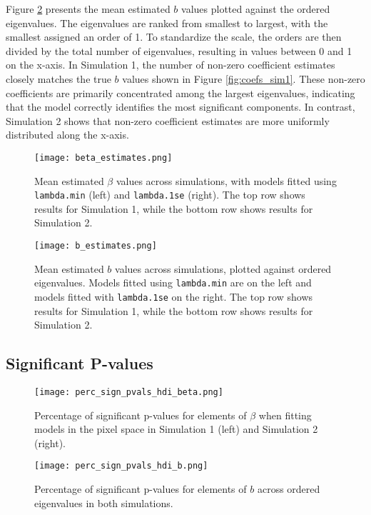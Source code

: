 \documentclass[12pt]{article}
\begin{document}
Figure \ref{fig:b_estimates} presents the mean estimated \( b \) values plotted against the ordered eigenvalues. The eigenvalues are ranked from smallest to largest, with the smallest assigned an order of 1. To standardize the scale, the orders are then divided by the total number of eigenvalues, resulting in values between 0 and 1 on the x-axis. In Simulation 1, the number of non-zero coefficient estimates closely matches the true \( b \) values shown in Figure \ref{fig:coefs_sim1}. These non-zero coefficients are primarily concentrated among the largest eigenvalues, indicating that the model correctly identifies the most significant components. In contrast, Simulation 2 shows that non-zero coefficient estimates are more uniformly distributed along the x-axis.

\begin{figure}[h!]
	\centering
	\texttt{[image: beta\_estimates.png]}
	\caption{Mean estimated \( \beta \) values across simulations, with models fitted using \texttt{lambda.min} (left) and
		\texttt{lambda.1se} (right). The top row shows results for Simulation 1, while the bottom row shows results for Simulation 2.}
	\label{fig:beta_estimates}
\end{figure}

\begin{figure}[h!]
	\centering
	\texttt{[image: b\_estimates.png]}
	\caption{Mean estimated \( b \) values across simulations, plotted against ordered eigenvalues. Models fitted using
		\texttt{lambda.min} are on the left and models fitted with \texttt{lambda.1se} on the right. The top row shows results for Simulation 1, while the bottom row shows results for Simulation 2.}
	\label{fig:b_estimates}
\end{figure}

\FloatBarrier

\subsection*{Significant P-values}

\begin{figure}[h!]
	\centering
	\texttt{[image: perc\_sign\_pvals\_hdi\_beta.png]}
	\caption{Percentage of significant p-values for elements of \( \beta \) when fitting models in the pixel space in
		Simulation 1 (left) and Simulation 2 (right).}
	\label{fig:perc_sign_beta}
\end{figure}

\begin{figure}[h!]
	\centering
	\texttt{[image: perc\_sign\_pvals\_hdi\_b.png]}
	\caption{Percentage of significant p-values for elements of \( b \) across ordered eigenvalues in both simulations.}
	\label{fig:perc_sign_b}
\end{figure}
\end{document}
